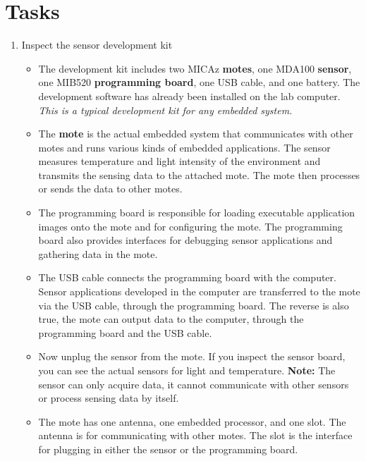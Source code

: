 \documentclass[letterpaper,12pt]{article}
\begin{document}
\section*{Tasks}
\begin{enumerate}
   \item Inspect the sensor development kit
      \begin{itemize}
         \item The development kit includes two MICAz \textbf{motes}, one MDA100 \textbf{sensor},
            one MIB520 \textbf{programming board}, one USB cable, and one battery.
               The development software has already been installed on the lab computer.
               \textit{This is a typical development kit for any embedded system.}
            \item The \textbf{mote} is the actual embedded system that communicates with
               other motes and runs various kinds of embedded applications. The
               sensor measures temperature and light intensity of the environment
               and transmits the sensing data to the attached mote.
               The mote then processes or sends the data to other motes.
         \item The programming board is responsible for loading executable application
               images onto the mote and for configuring the mote. The programming board
               also provides interfaces for debugging sensor applications and
               gathering data in the mote.
         \item The USB cable connects the programming board with the computer.
               Sensor applications developed in the computer are transferred
               to the mote via the USB cable, through the programming board. The
               reverse is also true, the mote can output data to the computer,
               through the programming board and the USB cable.
         \item Now unplug the sensor from the mote. If you inspect the
               sensor board, you can see the actual sensors for light and temperature.
               \textbf{Note:} The sensor can only acquire data, it cannot communicate with
               other sensors or process sensing data by itself.
         \item The mote has one antenna, one embedded processor, and one slot.
               The antenna is for communicating with other motes. The slot is
               the interface for plugging in either the sensor or the programming board.

\end{itemize}
\end{enumerate}
\end{document}
